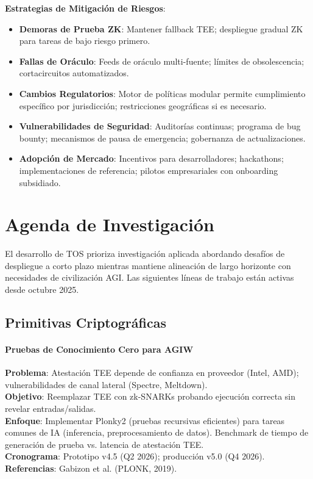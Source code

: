 \documentclass[11pt]{article}
\begin{document}
\textbf{Estrategias de Mitigación de Riesgos}:
\begin{itemize}[noitemsep]
  \item \textbf{Demoras de Prueba ZK}: Mantener fallback TEE; despliegue gradual ZK para tareas de bajo riesgo primero.
  \item \textbf{Fallas de Oráculo}: Feeds de oráculo multi-fuente; límites de obsolescencia; cortacircuitos automatizados.
  \item \textbf{Cambios Regulatorios}: Motor de políticas modular permite cumplimiento específico por jurisdicción; restricciones geográficas si es necesario.
  \item \textbf{Vulnerabilidades de Seguridad}: Auditorías continuas; programa de bug bounty; mecanismos de pausa de emergencia; gobernanza de actualizaciones.
  \item \textbf{Adopción de Mercado}: Incentivos para desarrolladores; hackathons; implementaciones de referencia; pilotos empresariales con onboarding subsidiado.
\end{itemize}

\section{Agenda de Investigación}
\label{sec:research}

El desarrollo de TOS prioriza investigación aplicada abordando desafíos de despliegue a corto plazo mientras mantiene alineación de largo horizonte con necesidades de civilización AGI. Las siguientes líneas de trabajo están activas desde octubre 2025.

\subsection{Primitivas Criptográficas}

\paragraph{Pruebas de Conocimiento Cero para AGIW}
\textbf{Problema}: Atestación TEE depende de confianza en proveedor (Intel, AMD); vulnerabilidades de canal lateral (Spectre, Meltdown).\\
\textbf{Objetivo}: Reemplazar TEE con zk-SNARKs probando ejecución correcta sin revelar entradas/salidas.\\
\textbf{Enfoque}: Implementar Plonky2 (pruebas recursivas eficientes) para tareas comunes de IA (inferencia, preprocesamiento de datos). Benchmark de tiempo de generación de prueba vs. latencia de atestación TEE.\\
\textbf{Cronograma}: Prototipo v4.5 (Q2 2026); producción v5.0 (Q4 2026).\\
\textbf{Referencias}: Gabizon et al. (PLONK, 2019).
\end{document}
